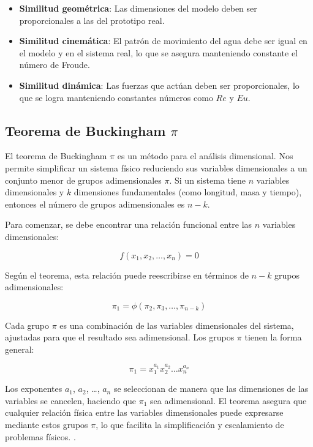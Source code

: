 \begin{itemize}
    \item \textbf{Similitud geométrica}: Las dimensiones del modelo deben ser proporcionales a las del prototipo real.
    \item \textbf{Similitud cinemática}: El patrón de movimiento del agua debe ser igual en el modelo y en el sistema real, lo que se asegura manteniendo constante el número de Froude.
    \item \textbf{Similitud dinámica}: Las fuerzas que actúan deben ser proporcionales, lo que se logra manteniendo constantes números como $Re$ y $Eu$.
\end{itemize}

\subsection{Teorema de Buckingham $\pi$}

El teorema de Buckingham $\pi$ es un método para el análisis dimensional. Nos permite simplificar un sistema físico reduciendo sus variables dimensionales a un conjunto menor de grupos adimensionales $\pi$. Si un sistema tiene $n$ variables dimensionales y $k$ dimensiones fundamentales (como longitud, masa y tiempo), entonces el número de grupos adimensionales es $n - k$.

Para comenzar, se debe encontrar una relación funcional entre las $n$ variables dimensionales:

\begin{equation}
f(x_1, x_2, \ldots, x_n) = 0
\end{equation}

Según el teorema, esta relación puede reescribirse en términos de $n - k$ grupos adimensionales:

\begin{equation}
\pi_1 = \phi(\pi_2, \pi_3, \ldots, \pi_{n-k})
\end{equation}

Cada grupo $\pi$ es una combinación de las variables dimensionales del sistema, ajustadas para que el resultado sea adimensional. Los grupos $\pi$ tienen la forma general:

\begin{equation}
\pi_1 = x_1^{a_1} x_2^{a_2} \ldots x_n^{a_n}
\end{equation}

Los exponentes $a_1$, $a_2$, \ldots, $a_n$ se seleccionan de manera que las dimensiones de las variables se cancelen, haciendo que $\pi_1$ sea adimensional. El teorema asegura que cualquier relación física entre las variables dimensionales puede expresarse mediante estos grupos $\pi$, lo que facilita la simplificación y escalamiento de problemas físicos. \textbf{\cite{munson2011}}.

